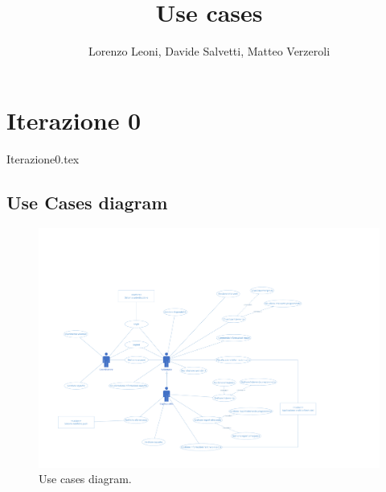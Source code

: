 \documentclass[
		a4paper,
		cleardoublepage=empty,
		headings=twolinechapter,
		numbers=autoenddot,
]{article}
\title{Use cases}
\author{Lorenzo Leoni, Davide Salvetti, Matteo Verzeroli}
\begin{document}
	\maketitle
	\section{Iterazione 0}
	{Iterazione0.tex}
	\subsection{Use Cases diagram}
	\begin{figure}[h]
		\centering
		\includegraphics[width=0.9\linewidth]{OtherFiles/Use cases diagram}
		\caption{Use cases diagram.}
		\label{fig:UseCaseDiagram}
	\end{figure}
\end{document}
